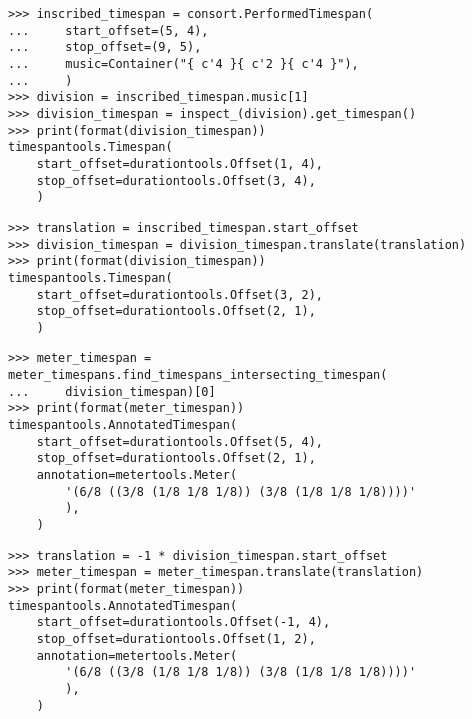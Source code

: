 \begin{abjadbookoutput}
\begin{singlespacing}
\vspace{-0.5\baselineskip}
\begin{lstlisting}
>>> inscribed_timespan = consort.PerformedTimespan(
...     start_offset=(5, 4),
...     stop_offset=(9, 5),
...     music=Container("{ c'4 }{ c'2 }{ c'4 }"),
...     )
>>> division = inscribed_timespan.music[1]
>>> division_timespan = inspect_(division).get_timespan()
>>> print(format(division_timespan))
timespantools.Timespan(
    start_offset=durationtools.Offset(1, 4),
    stop_offset=durationtools.Offset(3, 4),
    )
\end{lstlisting}
\begin{lstlisting}
>>> translation = inscribed_timespan.start_offset
>>> division_timespan = division_timespan.translate(translation)
>>> print(format(division_timespan))
timespantools.Timespan(
    start_offset=durationtools.Offset(3, 2),
    stop_offset=durationtools.Offset(2, 1),
    )
\end{lstlisting}
\begin{lstlisting}
>>> meter_timespan = meter_timespans.find_timespans_intersecting_timespan(
...     division_timespan)[0]
>>> print(format(meter_timespan))
timespantools.AnnotatedTimespan(
    start_offset=durationtools.Offset(5, 4),
    stop_offset=durationtools.Offset(2, 1),
    annotation=metertools.Meter(
        '(6/8 ((3/8 (1/8 1/8 1/8)) (3/8 (1/8 1/8 1/8))))'
        ),
    )
\end{lstlisting}
\begin{lstlisting}
>>> translation = -1 * division_timespan.start_offset
>>> meter_timespan = meter_timespan.translate(translation)
>>> print(format(meter_timespan))
timespantools.AnnotatedTimespan(
    start_offset=durationtools.Offset(-1, 4),
    stop_offset=durationtools.Offset(1, 2),
    annotation=metertools.Meter(
        '(6/8 ((3/8 (1/8 1/8 1/8)) (3/8 (1/8 1/8 1/8))))'
        ),
    )
\end{lstlisting}
\end{singlespacing}
\end{abjadbookoutput}

